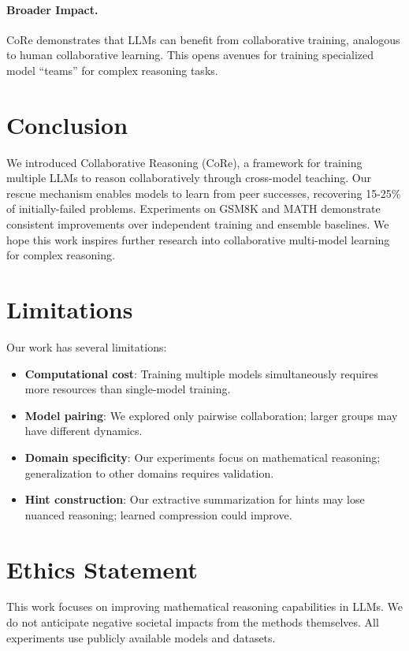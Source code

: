 \documentclass[11pt]{article}
\newcommand{\methodname}{CoRe}
\newcommand{\fullmethodname}{Collaborative Reasoning}
\begin{document}
\paragraph{Broader Impact.}
\methodname{} demonstrates that LLMs can benefit from collaborative training, analogous to human collaborative learning. This opens avenues for training specialized model ``teams'' for complex reasoning tasks.

\section{Conclusion}

We introduced \fullmethodname{} (\methodname{}), a framework for training multiple LLMs to reason collaboratively through cross-model teaching. Our rescue mechanism enables models to learn from peer successes, recovering 15-25\% of initially-failed problems. Experiments on GSM8K and MATH demonstrate consistent improvements over independent training and ensemble baselines. We hope this work inspires further research into collaborative multi-model learning for complex reasoning.

\section*{Limitations}

Our work has several limitations:
\begin{itemize}
    \item \textbf{Computational cost}: Training multiple models simultaneously requires more resources than single-model training.
    \item \textbf{Model pairing}: We explored only pairwise collaboration; larger groups may have different dynamics.
    \item \textbf{Domain specificity}: Our experiments focus on mathematical reasoning; generalization to other domains requires validation.
    \item \textbf{Hint construction}: Our extractive summarization for hints may lose nuanced reasoning; learned compression could improve.
\end{itemize}

\section*{Ethics Statement}

This work focuses on improving mathematical reasoning capabilities in LLMs. We do not anticipate negative societal impacts from the methods themselves. All experiments use publicly available models and datasets.
\end{document}
